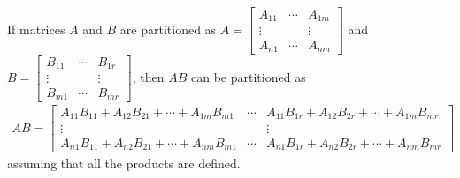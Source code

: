 \begin{plaintheorem}
	If matrices $A$ and $B$ are partitioned as $A = \begin{bmatrix}
	A_{11} & \cdots & A_{1m} \\
	\vdots &        & \vdots \\
	A_{n1} & \cdots & A_{nm}
	\end{bmatrix}$ and $B = \begin{bmatrix}
	B_{11} & \cdots & B_{1r} \\
	\vdots &        & \vdots \\
	B_{m1} & \cdots & B_{mr}
	\end{bmatrix}$, then $AB$ can be partitioned as
	\begin{align*}
	AB = \begin{bmatrix}
	A_{11}B_{11} + A_{12}B_{21} + \cdots + A_{1m}B_{m1}
	& \cdots & A_{11}B_{1r} + A_{12}B_{2r} + \cdots + A_{1m}B_{mr} \\
	\vdots & & \vdots \\
	A_{n1}B_{11} + A_{n2}B_{21} + \cdots + A_{nm}B_{m1}
	& \cdots & A_{n1}B_{1r} + A_{n2}B_{2r} + \cdots + A_{nm}B_{mr}
	\end{bmatrix}
	\end{align*} assuming that all the products are defined.
\end{plaintheorem}
